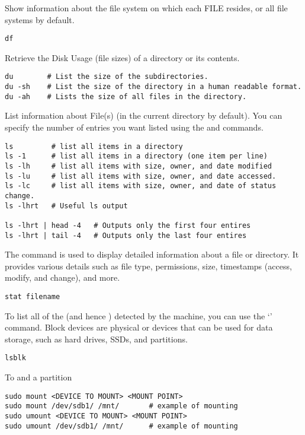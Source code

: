 Show information about the file system on which each FILE resides, or all file systems by default.
\begin{lstlisting}
df 
\end{lstlisting}

Retrieve the Disk Usage (file sizes) of a directory or its contents.
\begin{lstlisting}
du        # List the size of the subdirectories.
du -sh    # List the size of the directory in a human readable format.
du -ah    # Lists the size of all files in the directory.
\end{lstlisting}

List information about File(s) (in the current directory by default). You can specify the number of entries you want listed using the  and  commands.
\begin{lstlisting}
ls         # list all items in a directory
ls -1      # list all items in a directory (one item per line)
ls -lh     # list all items with size, owner, and date modified
ls -lu     # list all items with size, owner, and date accessed.
ls -lc     # list all items with size, owner, and date of status change. 
ls -lhrt   # Useful ls output

ls -lhrt | head -4	 # Outputs only the first four entires
ls -lhrt | tail -4	 # Outputs only the last four entires
\end{lstlisting}

The  command is used to display detailed information about a file or directory. It provides various details such as file type, permissions, size, timestamps (access, modify, and change), and more.
\begin{lstlisting}
stat filename
\end{lstlisting}

To list all of the  (and hence ) detected by the machine, you can use the `' command. Block devices are physical or  devices that can be used for data storage, such as hard drives, SSDs, and partitions.\begin{lstlisting}
lsblk
\end{lstlisting}

To  and  a partition
\begin{lstlisting}
sudo mount <DEVICE TO MOUNT> <MOUNT POINT>
sudo mount /dev/sdb1/ /mnt/       # example of mounting
sudo umount <DEVICE TO MOUNT> <MOUNT POINT>
sudo umount /dev/sdb1/ /mnt/      # example of mounting
\end{lstlisting}


